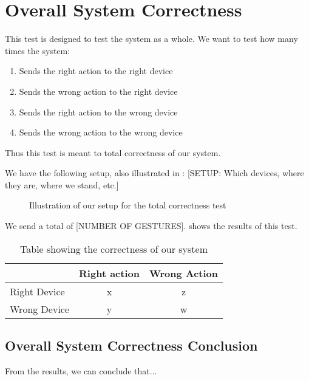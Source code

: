 \section{Overall System Correctness}\label{sec:systemcorrectness}
This test is designed to test the system as a whole. 
We want to test how many times the system:
\begin{enumerate}
    \item Sends the right action to the right device
    \item Sends the wrong action to the right device
    \item Sends the right action to the wrong device
    \item Sends the wrong action to the wrong device
\end{enumerate}
Thus this test is meant to total correctness of our system. 

We have the following setup, also illustrated in :
[SETUP: Which devices, where they are, where we stand, etc.]
\begin{figure}[!htb]
    \centering
    \caption{Illustration of our setup for the total correctness test}
    \label{fig:totalcorrectness}
\end{figure}

We send a total of [NUMBER OF GESTURES]. 
 shows the results of this test.

\begin{table}
    \centering
    \begin{tabular}{l|cc}
                     & Right action & Wrong Action \\ \hline
        Right Device &      x       &     z        \\
        Wrong Device &      y       &     w        \\
    \end{tabular} 
    
    \caption{Table showing the correctness of our system}
    \label{table:correctnessresults}
\end{table}

\subsection{Overall System Correctness Conclusion}
From the results, we can conclude that... 
